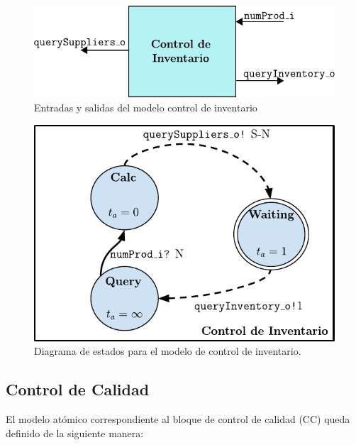 \documentclass[10pt]{article}
\begin{document}
\begin{figure}[h]
	\centering
	\includegraphics{img/CI-esquematico}
	\caption{Entradas y salidas del modelo control de inventario}
	\label{fig:CI-esquematico}
\end{figure}

\begin{figure}[h]
	\centering
	\includegraphics{img/controlInventariodevsgraph}
	\caption{Diagrama de estados para el modelo de control de inventario.}
	\label{fig:CI-estados}
\end{figure}
\FloatBarrier

\subsection{Control de Calidad\label{sec:CC}}
El modelo atómico correspondiente al bloque de control de calidad (CC) queda definido de la siguiente manera:
\end{document}
